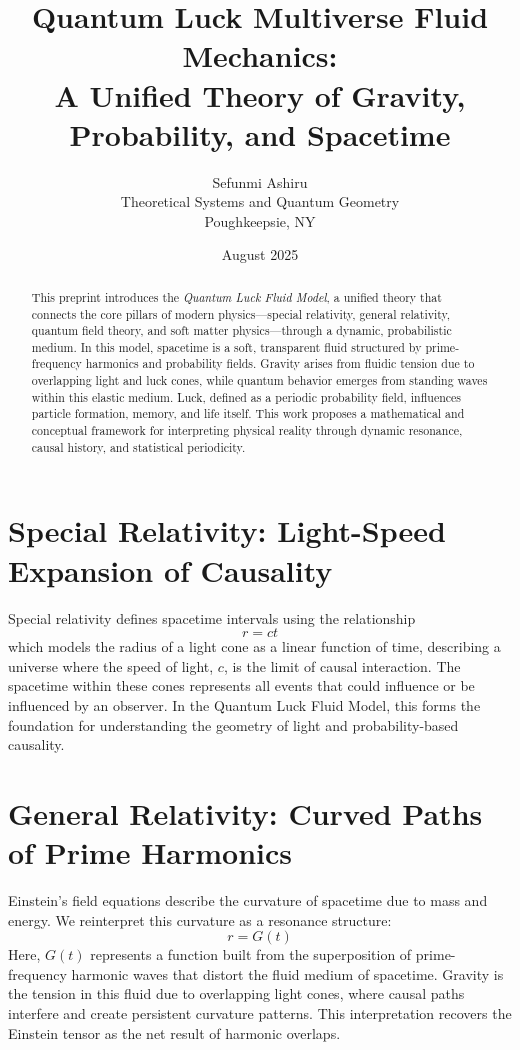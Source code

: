 \documentclass[12pt]{article}
\title{Quantum Luck Multiverse Fluid Mechanics:\\A Unified Theory of Gravity, Probability, and Spacetime}
\author{Sefunmi Ashiru\\Theoretical Systems and Quantum Geometry\\Poughkeepsie, NY}
\date{August 2025}
\begin{document}
\maketitle

\begin{abstract}
This preprint introduces the \emph{Quantum Luck Fluid Model}, a unified theory that connects the core pillars of modern physics---special relativity, general relativity, quantum field theory, and soft matter physics---through a dynamic, probabilistic medium. In this model, spacetime is a soft, transparent fluid structured by prime-frequency harmonics and probability fields. Gravity arises from fluidic tension due to overlapping light and luck cones, while quantum behavior emerges from standing waves within this elastic medium. Luck, defined as a periodic probability field, influences particle formation, memory, and life itself. This work proposes a mathematical and conceptual framework for interpreting physical reality through dynamic resonance, causal history, and statistical periodicity.
\end{abstract}

\section{Special Relativity: Light-Speed Expansion of Causality}
Special relativity defines spacetime intervals using the relationship
\begin{equation}
    r = ct
\end{equation}
which models the radius of a light cone as a linear function of time, describing a universe where the speed of light, $c$, is the limit of causal interaction. The spacetime within these cones represents all events that could influence or be influenced by an observer. In the Quantum Luck Fluid Model, this forms the foundation for understanding the geometry of light and probability-based causality.

\section{General Relativity: Curved Paths of Prime Harmonics}
Einstein's field equations describe the curvature of spacetime due to mass and energy. We reinterpret this curvature as a resonance structure:
\begin{equation}
    r = G(t)
\end{equation}
Here, $G(t)$ represents a function built from the superposition of prime-frequency harmonic waves that distort the fluid medium of spacetime. Gravity is the tension in this fluid due to overlapping light cones, where causal paths interfere and create persistent curvature patterns. This interpretation recovers the Einstein tensor as the net result of harmonic overlaps.
\end{document}
